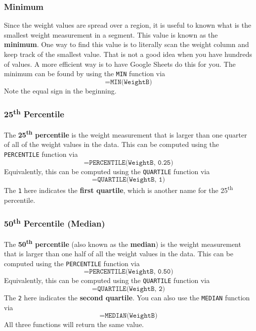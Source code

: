 \subsubsection{Minimum}
%
Since the weight values are spread over a region, it is useful to known what is the smallest weight measurement in a segment. This value is known as the \textbf{minimum}. One way to find this value is to literally scan the weight column and keep track of the smallest value. That is not a good idea when you have hundreds of values. A more efficient way is to have Google Sheets do this for you. The minimum can be found by using the \texttt{MIN} function via
\begin{equation}
    \texttt{=MIN(WeightB)}
    \label{eq:00.min}
\end{equation}
Note the equal sign in the beginning.
%
\subsubsection{25\textsuperscript{th} Percentile}
%
The \textbf{25\textsuperscript{th} percentile} is the weight measurement that is larger than one quarter of all of the weight values in the data. This can be computed using the \texttt{PERCENTILE} function via
\begin{equation}
    \texttt{=PERCENTILE(WeightB, 0.25)}
    \label{eq:00.percentile.25}
\end{equation}
Equivalently, this can be computed using the \texttt{QUARTILE} function via
\begin{equation}
    \texttt{=QUARTILE(WeightB, 1)}
\end{equation}
The \texttt{1} here indicates the \textbf{first quartile}, which is another name for the 25\textsuperscript{th} percentile.
%
\subsubsection{50\textsuperscript{th} Percentile (Median)}
%
The \textbf{50\textsuperscript{th} percentile} (also known as the \textbf{median}) is the weight measurement that is larger than one half of all the weight values in the data. This can be computed using the \texttt{PERCENTILE} function via
\begin{equation}
    \texttt{=PERCENTILE(WeightB, 0.50)}
    \label{eq:00.percentile.50}
\end{equation}
Equivalently, this can be computed using the \texttt{QUARTILE} function via
\begin{equation}
    \texttt{=QUARTILE(WeightB, 2)}
\end{equation}
The \texttt{2} here indicates the \textbf{second quartile}. You can also use the \texttt{MEDIAN} function via
\begin{equation}
    \texttt{=MEDIAN(WeightB)}
    \label{eq:00.median}
\end{equation}
All three functions will return the same value.
%
